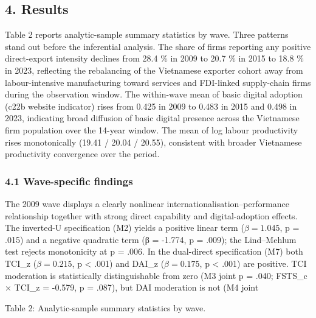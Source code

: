 \documentclass[12pt,a4paper]{article}
\begin{document}
\hypertarget{4-results}{%
\subsection{4. Results}\label{4-results}}

Table 2 reports analytic-sample summary statistics by wave. Three
patterns stand out before the inferential analysis. The share of firms
reporting any positive direct-export intensity declines from 28.4 \% in
2009 to 20.7 \% in 2015 to 18.8 \% in 2023, reflecting the rebalancing
of the Vietnamese exporter cohort away from labour-intensive
manufacturing toward services and FDI-linked supply-chain firms during
the observation window. The within-wave mean of basic digital adoption
(c22b website indicator) rises from 0.425 in 2009 to 0.483 in 2015 and
0.498 in 2023, indicating broad diffusion of basic digital presence
across the Vietnamese firm population over the 14-year window. The mean
of log labour productivity rises monotonically (19.41 / 20.04 / 20.55),
consistent with broader Vietnamese productivity convergence over the
period.

\hypertarget{41-wave-specific-findings}{%
\subsubsection{4.1 Wave-specific
findings}\label{41-wave-specific-findings}}

The 2009 wave displays a clearly nonlinear
internationalisation--performance relationship together with strong
direct capability and digital-adoption effects. The inverted-U
specification (M2) yields a positive linear term (\(\beta = 1.045\), p =
.015) and a negative quadratic term (β = -1.774, p = .009); the
Lind--Mehlum test rejects monotonicity at p = .006. In the dual-direct
specification (M7) both TCI\_z (\(\beta = 0.215\), p \textless{} .001)
and DAI\_z (\(\beta = 0.175\), p \textless{} .001) are positive. TCI
moderation is statistically distinguishable from zero (M3 joint p =
.040; FSTS\_c × TCI\_z = -0.579, p = .087), but DAI moderation is not
(M4 joint

Table 2: Analytic-sample summary statistics by wave.
\end{document}

